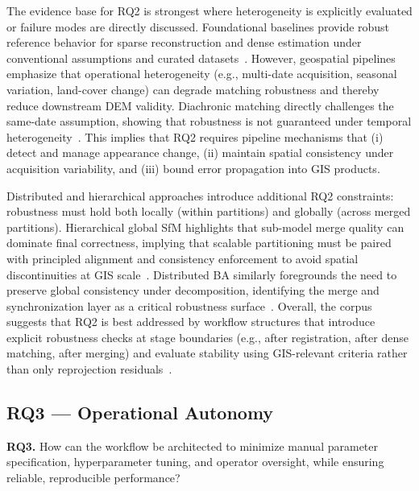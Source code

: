 The evidence base for RQ2 is strongest where heterogeneity is explicitly evaluated or failure modes are directly discussed. Foundational baselines provide robust reference behavior for sparse reconstruction and dense estimation under conventional assumptions and curated datasets~\cite{Schonberger2016,Schonberger2016MVS}. However, geospatial pipelines emphasize that operational heterogeneity (e.g., multi-date acquisition, seasonal variation, land-cover change) can degrade matching robustness and thereby reduce downstream DEM validity. Diachronic matching directly challenges the same-date assumption, showing that robustness is not guaranteed under temporal heterogeneity~\cite{Masquil2026}. This implies that RQ2 requires pipeline mechanisms that (i) detect and manage appearance change, (ii) maintain spatial consistency under acquisition variability, and (iii) bound error propagation into GIS products.

Distributed and hierarchical approaches introduce additional RQ2 constraints: robustness must hold both locally (within partitions) and globally (across merged partitions). Hierarchical global SfM highlights that sub-model merge quality can dominate final correctness, implying that scalable partitioning must be paired with principled alignment and consistency enforcement to avoid spatial discontinuities at GIS scale~\cite{Zhou2026}. Distributed BA similarly foregrounds the need to preserve global consistency under decomposition, identifying the merge and synchronization layer as a critical robustness surface~\cite{Zheng2023,Li2025BALM}. Overall, the corpus suggests that RQ2 is best addressed by workflow structures that introduce explicit robustness checks at stage boundaries (e.g., after registration, after dense matching, after merging) and evaluate stability using GIS-relevant criteria rather than only reprojection residuals~\cite{Elias2025}.

\subsection{RQ3 --- Operational Autonomy}

\textbf{RQ3.} How can the workflow be architected to minimize manual parameter specification, hyperparameter tuning, and operator oversight, while ensuring reliable, reproducible performance?

